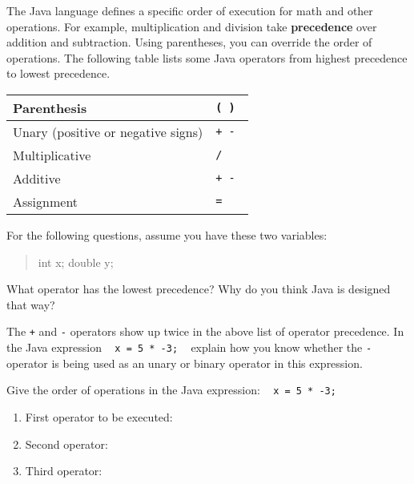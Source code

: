 
The Java language defines a specific order of execution for math and other operations. For example, multiplication and division take \textbf{precedence} over addition and subtraction. Using parentheses, you can override the order of operations. The following table lists some Java operators from highest precedence to lowest precedence.

\begin{center}
\renewcommand{\arraystretch}{1.5}
\begin{tabular}{|L{3in}|L{1in}|}
\hline
Parenthesis
& \tt ( ) \\
\hline
Unary (positive or negative signs)
& \tt + - \\
\hline
Multiplicative
& \tt * / \\
\hline
Additive
& \tt + - \\
\hline
Assignment
& \tt = \\
\hline
\end{tabular}
\end{center}

For the following questions, assume you have these two variables:

\begin{quote}
\begin{java}
int x;
double y;
\end{java}
\end{quote}



\Q What operator has the lowest precedence? Why do you think Java is designed that way?

\begin{answer}
\end{answer}


\Q The \texttt{+} and \texttt{-} operators show up twice in the above list of operator precedence. In the Java expression ~ \texttt{x = 5 * -3;} ~ explain how you know whether the \texttt{-} operator is being used as an unary or binary operator in this expression.

\begin{answer}
\end{answer}


\Q Give the order of operations in the Java expression: ~ \texttt{x = 5 * -3;}

\begin{enumerate}
\item First operator to be executed:
\item Second operator:
\item Third operator:
\end{enumerate}



